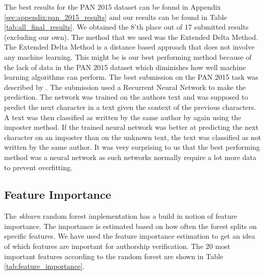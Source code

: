 The best results for the PAN 2015 dataset can be found in Appendix
\ref{sec:appendix:pan_2015_results} and our results can be found in Table
\ref{tab:all_final_results}. We obtained the 8'th place out of 17 submitted
results (excluding our own). The method that we used was the Extended Delta
Method. The Extended Delta Method is a distance based approach that does not
involve any machine learning. This might be is our best performing method
because of the lack of data in the PAN 2015 dataset which diminishes how well
machine learning algorithms can perform. The best submission on the PAN 2015
task was described by \cite{bagnall:2015}. The submission used a Recurrent
Neural Network to make the prediction. The network was trained on the authors
text and was supposed to predict the next character in a text given the context
of the previous characters. A text was then classified as written by the same
author by again using the imposter method. If the trained neural network was
better at predicting the next character on an imposter than on the unknown
text, the text was classified as not written by the same author. It was very
surprising to us that the best performing method was a neural network as such
networks normally require a lot more data to prevent overfitting.

\subsection{Feature Importance}

The \textit{sklearn} random forest implementation has a build in notion of
feature importance. The importance is estimated based on how often the forest
splits on specific features. We have used the feature importance estimation to
get an idea of which features are important for authorship verification. The
20 most important features according to the random forest are shown in Table
\ref{tab:feature_importance}.

